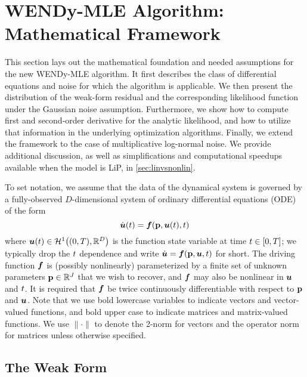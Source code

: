 \section{WENDy-MLE Algorithm: Mathematical Framework} \label{sec:mamathematical-frameworkth}
This section lays out the mathematical foundation and needed assumptions for the new WENDy-MLE algorithm. It first describes the class of differential equations and noise for which the algorithm is applicable. We then present the distribution of the weak-form residual and the corresponding likelihood function under the Gaussian noise assumption. Furthermore, we show how to compute first and second-order derivative for the analytic likelihood, and how to utilize that information in the underlying optimization algorithms. Finally, we extend the framework to the case of multiplicative log-normal noise. We provide additional discussion, as well as simplifications and computational speedups available when the model is LiP, in \ref{sec:linvsnonlin}.

To set notation, we assume that the data of the dynamical system is governed by a fully-observed $D$-dimensional system of ordinary differential equations (ODE) of the form 
\begin{equation}
	\label{eq:ode-strong}
	\dot{\boldsymbol{u}}(t) = \boldsymbol{f}(\mathbf{p},\boldsymbol{u}(t),t)
\end{equation}
where $\boldsymbol{u}(t) \in \mathcal{H}^1\bigl((0,T),\mathbb{R}^D\bigr)$ is the function state variable at time $t \in [0,T]$; we typically drop the $t$ dependence and write $\dot{\boldsymbol{u}} = \boldsymbol{f}(\mathbf{p}, \boldsymbol{u},t)$ for short. 
The driving function $\boldsymbol{f}$ is (possibly nonlinearly) parameterized by a finite set of unknown parameters $\mathbf{p}\in\mathbb{R}^J$ that we wish to recover, and $\boldsymbol{f}$ may also be nonlinear in $\boldsymbol{u}$ and $t$. It is required that $\boldsymbol{f}$ be twice continuously differentiable with respect to $\mathbf{p}$ and  $\boldsymbol{u}$. Note that we use bold lowercase variables to indicate vectors and vector-valued functions, and bold upper case to indicate matrices and matrix-valued functions. We use $\|\cdot\|$ to denote the 2-norm for vectors and the operator norm for matrices unless otherwise specified.

\subsection{The Weak Form}

